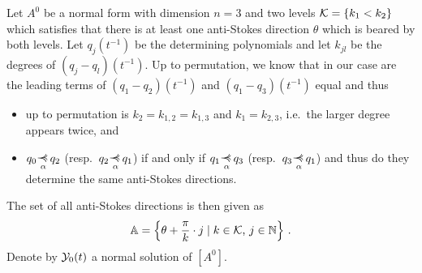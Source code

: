 Let $A^0$ be a normal form with dimension $n=3$ and two levels
$\mathcal{K}=\{k_1<k_2\}$ which satisfies that there is at least one anti-Stokes
direction $\theta$ which is beared by both levels.
Let $q_j(t^{-1})$ be the determining polynomials and let $k_{jl}$ be the
degrees of $(q_j-q_l)(t^{-1})$.
Up to permutation, we know that in our case are the leading terms of
$(q_1-q_2)(t^{-1})$ and $(q_1-q_3)(t^{-1})$ equal and thus
\begin{itemize}
  \item up to permutation is $k_2=k_{1,2}=k_{1,3}$ and $k_1=k_{2,3}$, i.e.\ the
    larger degree appears twice, and
    \begin{comment}
      let $q_1,q_2,q_3$ be polynomials, such that
      \[
        \deg(q_1-q_2) =: k_2 > k_1 := \deg(q_2-q_3)
      \]
      then is the degree of $q_1-q_3$ given by
      \begin{itemize}
        \item[\textbf{case 1}] $\deg(q_1)<k_2$: then is $\deg(q_2)=k_2$ and
          thus $\deg(q_3)=k_2$.
        \item[\textbf{case 2}] $\deg(q_2)<k_2$: then is $\deg(q_1)=k_2$ and
          $\deg(q_3)\leq\deg(q_2)$.
        \item[\textbf{case 3}] $\deg(q_1)=\deg(q_2)=k_2$: thus follows that the
          leading term of $q_1$ and $q_2$ are different.
          \begin{itemize}
            \item[\textbf{subcase 3.a}] $\deg(q_3)<k_2$: everything is clear
            \item[\textbf{subcase 3.b}] $\deg(q_3)=k_2$: here has the leading
              term of $q_3$ be equal to them from $q_1$ to satisfy that
              $k_2>\deg(q_2-q_3)$.
          \end{itemize}
      \end{itemize}
      From this follows that $\deg(q_1-q_3)=k_2$.
    \end{comment}
  \item $q_0\myrel{\alpha}q_2$ (resp.~$q_2\myrel{\alpha}q_1$) if and only if
    $q_1\myrel{\alpha}q_3$ (resp.~$q_3\myrel{\alpha}q_1$) and thus do they
    determine the same anti-Stokes directions.
\end{itemize}
The set of all anti-Stokes directions is then given as
\[
  \mathbb{A}=\left\{\theta+\frac{\pi}{k}\cdot j\mid k\in\mathcal{K}\text{, }j\in\mathbb{N}\right\} \,.
\]
Denote by $\mathcal{Y}_0(t)$ a normal solution of $[A^0]$.

